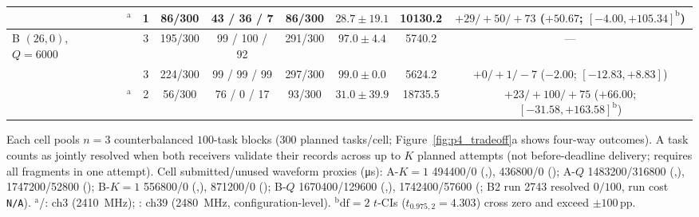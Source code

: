 \begin{table}[t]
\begin{tabular}{@{}llccccccc@{}}
  & \modelc{}$^{\mathrm{a}}$ & 1 & 86/300  & 43 / 36 / 7  & 86/300  & $28.7 \pm 19.1$ & \num{10130.2} & $+29/{+}50/{+}73$ ($+50.67$; $[-4.00, +105.34]^{\mathrm{b}}$) \\
\midrule
\multirow{3}{*}{B $(26,0)$, $Q{=}6000$}
  & \modejc{}              & 3 & 195/300 & 99 / 100 / 92 & 291/300 & $97.0 \pm 4.4$  & \num{5740.2}  & --- \\
  & \modesc{}              & 3 & 224/300 & 99 / 99 / 99  & 297/300 & $99.0 \pm 0.0$  & \num{5624.2}  & $+0/{+}1/{-}7$ ($-2.00$; $[-12.83, +8.83]$) \\
  & \modelc{}$^{\mathrm{a}}$ & 2 & 56/300  & 76 / 0 / 17   & 93/300  & $31.0 \pm 39.9$ & \num{18735.5} & $+23/{+}100/{+}75$ ($+66.00$; $[-31.58, +163.58]^{\mathrm{b}}$) \\
\bottomrule
\end{tabular}
\par\smallskip
\raggedright\scriptsize
Each cell pools $n{=}3$ counterbalanced $100$-task blocks ($300$ planned tasks/cell; Figure~\ref{fig:p4_tradeoff}a shows four-way outcomes). A task counts as jointly resolved when both receivers validate their records across up to $K$ planned attempts (not before-deadline delivery; \modelc{} requires all fragments in one attempt). Cell submitted/unused waveform proxies (\si{\micro\second}): A-$K{=}1$ \num{494400}/$0$ (\modejc{},\modesc{}), \num{436800}/$0$ (\modelc{}); A-$Q$ \num{1483200}/\num{316800} (\modejc{},\modesc{}), \num{1747200}/\num{52800} (\modelc{}); B-$K{=}1$ \num{556800}/$0$ (\modejc{},\modesc{}), \num{871200}/$0$ (\modelc{}); B-$Q$ \num{1670400}/\num{129600} (\modejc{},\modesc{}), \num{1742400}/\num{57600} (\modelc{}; B2 run 2743 resolved $0/100$, run cost \texttt{N/A}). $^{\mathrm{a}}$\modejc{}/\modesc{}: \ble{} ch3 (\SI{2410}{MHz}); \modelc{}: ch39 (\SI{2480}{MHz}, configuration-level). $^{\mathrm{b}}$$\text{df}{=}2$ $t$-CIs ($t_{0.975,2}{=}4.303$) cross zero and exceed $\pm 100$\,pp.
\end{table}
